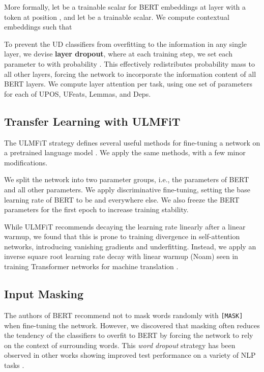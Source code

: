 \documentclass[11pt,a4paper]{article}
\begin{document}
More formally, let  be a trainable scalar for BERT embeddings  at layer  with a token at position , and let  be a trainable scalar.
We compute contextual embeddings  such that



To prevent the UD classifiers from overfitting to the information in any single layer, we devise {\bf layer dropout}, where at each training step, we set each parameter  to  with probability .
This effectively redistributes probability mass to all other layers, forcing the network to incorporate the information content of all BERT layers.
We compute layer attention per task, using one set of  parameters for each of UPOS, UFeats, Lemmas, and Deps.

\subsection{Transfer Learning with ULMFiT} \label{sec:ulmfit}

The ULMFiT strategy defines several useful methods for fine-tuning a network on a pretrained language model \cite{howard2018universal}. We apply the same methods, with a few minor modifications.

We split the network into two parameter groups, i.e., the parameters of BERT and all other parameters.
We apply discriminative fine-tuning, setting the base learning rate of BERT to be  and  everywhere else.
We also freeze the BERT parameters for the first epoch to increase training stability.

While ULMFiT recommends decaying the learning rate linearly after a linear warmup, we found that this is prone to training divergence in self-attention networks, introducing vanishing gradients and underfitting.
Instead, we apply an inverse square root learning rate decay with linear warmup (Noam) seen in training Transformer networks for machine translation \cite{vaswani2017attention}.

\subsection{Input Masking}

The authors of BERT recommend not to mask words randomly with {\tt [MASK]} when fine-tuning the network.
However, we discovered that masking often reduces the tendency of the classifiers to overfit to BERT by forcing the network to rely on the context of surrounding words.
This {\it word dropout} strategy has been observed in other works showing improved test performance on a variety of NLP tasks \cite{iyyer2015deep, bowman2016generating, clark2018semi, straka:2018:K18-2}.
\end{document}
